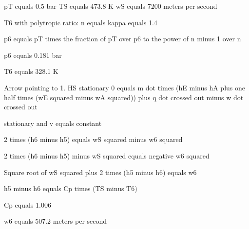 pT equals 0.5 bar  
TS equals 473.8 K  
wS equals 7200 meters per second  

T6 with polytropic ratio: n equals kappa equals 1.4  

p6 equals pT times the fraction of pT over p6 to the power of n minus 1 over n  

p6 equals 0.181 bar  

T6 equals 328.1 K  

Arrow pointing to 1. HS stationary  
0 equals m dot times (hE minus hA plus one half times (wE squared minus wA squared)) plus q dot crossed out minus w dot crossed out  

stationary and v equals constant  

2 times (h6 minus h5) equals wS squared minus w6 squared  

2 times (h6 minus h5) minus wS squared equals negative w6 squared  

Square root of wS squared plus 2 times (h5 minus h6) equals w6  

h5 minus h6 equals Cp times (TS minus T6)  

Cp equals 1.006  

w6 equals 507.2 meters per second